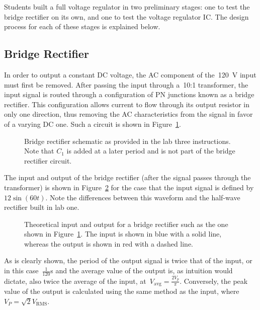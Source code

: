 Students built a full voltage regulator in two preliminary stages: one to test
the bridge rectifier on its own, and one to test the voltage regulator IC.  The
design process for each of these stages is explained below.

\subsection{Bridge Rectifier}
In order to output a constant DC voltage, the AC component of
the~\SI{120}{\volt} input must first be removed.  After passing the input
through a~10:1 transformer, the input signal is routed through a configuration
of PN junctions known as a bridge rectifier.  This configuration allows current
to flow through its output resistor in only one direction, thus removing the AC
characteristics from the signal in favor of a varying DC one.  Such a circuit
is shown in Figure~\ref{fig:bridgeSchem}.
%
\begin{figure}[H]
	\centering
	
	\parbox{.6\textwidth}{
	\caption{Bridge rectifier schematic as provided in the lab three
	instructions.  Note that $C_1$ is added at a later period and is not part
	of the bridge rectifier circuit.}
	\label{fig:bridgeSchem}}
\end{figure}
%
The input and output of the bridge rectifier (after the signal passes through the transformer) is shown
in Figure~\ref{fig:bridgeRectOut} for the case that the input signal is defined
by~$12 \sin(60t)$.  Note the differences between this waveform and the
half-wave rectifier built in lab one.
%
\begin{figure}[H]
	\centering
	
	\parbox{.6\textwidth}{
	\caption{Theoretical input and output for a bridge rectifier such as the
	one shown in Figure~\ref{fig:bridgeSchem}.  The input is shown in blue with
	a solid line, whereas the output is shown in red with a dashed line.}
	\label{fig:bridgeRectOut}
	}
\end{figure}
%
As is clearly shown, the period of the output signal is twice that of the
input, or in this case~$\frac{1}{120}$\si{\second} and the average value of the
output is, as intuition would dictate, also twice the average of the input,
at~$V_\text{avg} = \frac{2 V_p}{\pi}$.  Conversely, the peak value of the
output is calculated using the same method as the input,
where~$V_P=\sqrt{2}V_\mathrm{RMS}$.

